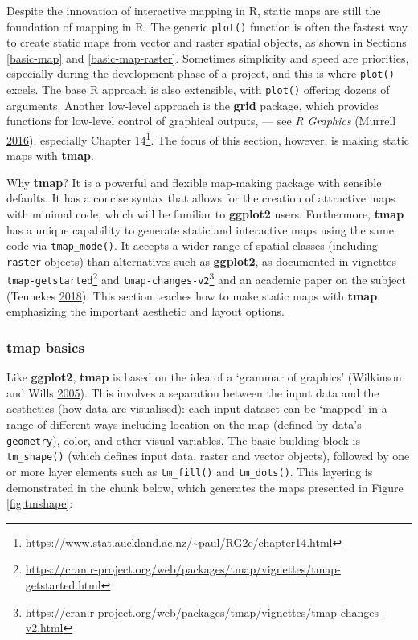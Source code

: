 \documentclass[]{krantz}
\let\rmarkdownfootnote\footnote%
\def\footnote{\protect\rmarkdownfootnote}
\renewcommand{\href}[2]{#2\footnote{\url{#1}}}
\begin{document}
Despite the innovation of interactive mapping in R, static maps are still the foundation of mapping in R.
The generic \texttt{plot()} function is often the fastest way to create static maps from vector and raster spatial objects, as shown in Sections \ref{basic-map} and \ref{basic-map-raster}.
Sometimes simplicity and speed are priorities, especially during the development phase of a project, and this is where \texttt{plot()} excels.
The base R approach is also extensible, with \texttt{plot()} offering dozens of arguments.
Another low-level approach is the \textbf{grid} package, which provides functions for low-level control of graphical outputs, --- see \emph{R Graphics} (Murrell \protect\hyperlink{ref-murrell_r_2016}{2016}), especially Chapter \href{https://www.stat.auckland.ac.nz/~paul/RG2e/chapter14.html}{14}.
The focus of this section, however, is making static maps with \textbf{tmap}.

Why \textbf{tmap}?
It is a powerful and flexible map-making package with sensible defaults.
It has a concise syntax that allows for the creation of attractive maps with minimal code, which will be familiar to \textbf{ggplot2} users.
Furthermore, \textbf{tmap} has a unique capability to generate static and interactive maps using the same code via \texttt{tmap\_mode()}.
It accepts a wider range of spatial classes (including \texttt{raster} objects) than alternatives such as \textbf{ggplot2}, as documented in vignettes \href{https://cran.r-project.org/web/packages/tmap/vignettes/tmap-getstarted.html}{\texttt{tmap-getstarted}} and \href{https://cran.r-project.org/web/packages/tmap/vignettes/tmap-changes-v2.html}{\texttt{tmap-changes-v2}} and an academic paper on the subject (Tennekes \protect\hyperlink{ref-tennekes_tmap_2018}{2018}).
This section teaches how to make static maps with \textbf{tmap}, emphasizing the important aesthetic and layout options.

\hypertarget{tmap-basics}{%
\subsubsection{tmap basics}\label{tmap-basics}}

Like \textbf{ggplot2}, \textbf{tmap} is based on the idea of a `grammar of graphics' (Wilkinson and Wills \protect\hyperlink{ref-wilkinson_grammar_2005}{2005}).
This involves a separation between the input data and the aesthetics (how data are visualised): each input dataset can be `mapped' in a range of different ways including location on the map (defined by data's \texttt{geometry}), color, and other visual variables.
The basic building block is \texttt{tm\_shape()} (which defines input data, raster and vector objects), followed by one or more layer elements such as \texttt{tm\_fill()} and \texttt{tm\_dots()}.
This layering is demonstrated in the chunk below, which generates the maps presented in Figure \ref{fig:tmshape}:
\end{document}
